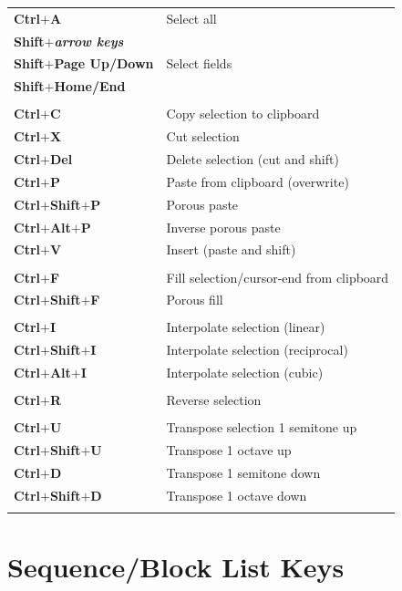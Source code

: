 \documentclass[12pt]{report}	%
\begin{document}
\begin{longtable}{p{} p{} }
\\
\textbf{Ctrl\(\bm{+}\)A} & Select all \\
\textbf{Shift\(\bm{+}\)\textit{arrow keys}} &\\
\textbf{Shift\(\bm{+}\)Page Up/Down} & Select fields\\
\textbf{Shift\(\bm{+}\)Home/End} & \\
\\
\textbf{Ctrl\(\bm{+}\)C} & Copy selection to clipboard \\
\textbf{Ctrl\(\bm{+}\)X} & Cut selection \\
\textbf{Ctrl\(\bm{+}\)Del} & Delete selection (cut and shift) \\
\textbf{Ctrl\(\bm{+}\)P} & Paste from clipboard (overwrite) \\
\textbf{Ctrl\(\bm{+}\)Shift\(\bm{+}\)P} & Porous paste \\
\textbf{Ctrl\(\bm{+}\)Alt\(\bm{+}\)P} & Inverse porous paste \\
\textbf{Ctrl\(\bm{+}\)V} & Insert (paste and shift) \\
\\
\textbf{Ctrl\(\bm{+}\)F} & Fill selection/cursor-end from clipboard \\
\textbf{Ctrl\(\bm{+}\)Shift\(\bm{+}\)F} & Porous fill \\
\\
\textbf{Ctrl\(\bm{+}\)I} & Interpolate selection (linear) \\
\textbf{Ctrl\(\bm{+}\)Shift\(\bm{+}\)I} & Interpolate selection (reciprocal) \\
\textbf{Ctrl\(\bm{+}\)Alt\(\bm{+}\)I} & Interpolate selection (cubic) \\
\\
\textbf{Ctrl\(\bm{+}\)R} & Reverse selection \\
\\
\textbf{Ctrl\(\bm{+}\)U} & Transpose selection 1 semitone up \\
\textbf{Ctrl\(\bm{+}\)Shift\(\bm{+}\)U} & Transpose 1 octave up \\
\textbf{Ctrl\(\bm{+}\)D} & Transpose 1 semitone down \\
\textbf{Ctrl\(\bm{+}\)Shift\(\bm{+}\)D} & Transpose 1 octave down \\
\\
\end{longtable}


\section{Sequence/Block List Keys}
\end{document}
